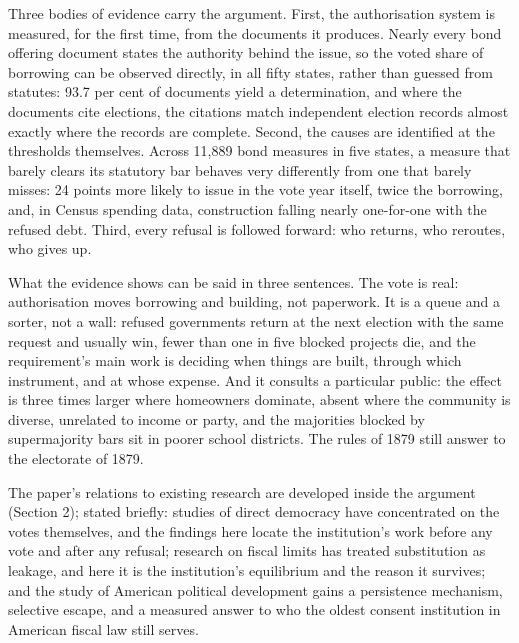 Three bodies of evidence carry the argument. First, the authorisation system is measured, for the first time, from the documents it produces. Nearly every bond offering document states the authority behind the issue, so the voted share of borrowing can be observed directly, in all fifty states, rather than guessed from statutes: 93.7 per cent of documents yield a determination, and where the documents cite elections, the citations match independent election records almost exactly where the records are complete. Second, the causes are identified at the thresholds themselves. Across 11,889 bond measures in five states, a measure that barely clears its statutory bar behaves very differently from one that barely misses: 24 points more likely to issue in the vote year itself, twice the borrowing, and, in Census spending data, construction falling nearly one-for-one with the refused debt. Third, every refusal is followed forward: who returns, who reroutes, who gives up.

What the evidence shows can be said in three sentences. The vote is real: authorisation moves borrowing and building, not paperwork. It is a queue and a sorter, not a wall: refused governments return at the next election with the same request and usually win, fewer than one in five blocked projects die, and the requirement's main work is deciding when things are built, through which instrument, and at whose expense. And it consults a particular public: the effect is three times larger where homeowners dominate, absent where the community is diverse, unrelated to income or party, and the majorities blocked by supermajority bars sit in poorer school districts. The rules of 1879 still answer to the electorate of 1879.

The paper's relations to existing research are developed inside the argument (Section 2); stated briefly: studies of direct democracy have concentrated on the votes themselves, and the findings here locate the institution's work before any vote and after any refusal; research on fiscal limits has treated substitution as leakage, and here it is the institution's equilibrium and the reason it survives; and the study of American political development gains a persistence mechanism, selective escape, and a measured answer to who the oldest consent institution in American fiscal law still serves.

